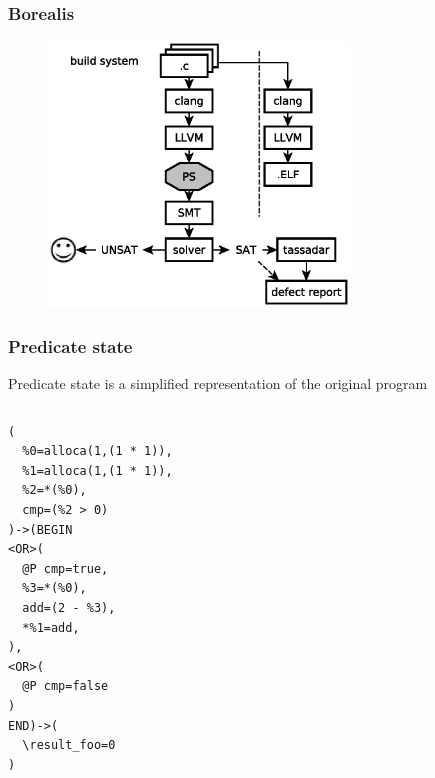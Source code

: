 
\begin{frame}
	\frametitle{Borealis}
	
	\begin{figure}
	\includegraphics[width=80mm]{image/BorealisOverview}
	\end{figure}	
	
\end{frame}



\begin{frame}[fragile]
	\frametitle{Predicate state}
	
	\begin{block}{}
	Predicate state is a simplified representation of the original program
	\end{block}
	
	\begin{columns}
	\begin{lstlisting}[language=PS, frame=single]
(
  %0=alloca(1,(1 * 1)),
  %1=alloca(1,(1 * 1)),
  %2=*(%0),
  cmp=(%2 > 0)
)->(BEGIN
<OR>(
  @P cmp=true,
  %3=*(%0),
  add=(2 - %3),
  *%1=add,
),
<OR>(
  @P cmp=false
)
END)->(
  \result_foo=0
)
	\end{lstlisting}
	
	\end{columns}
	
\end{frame}

